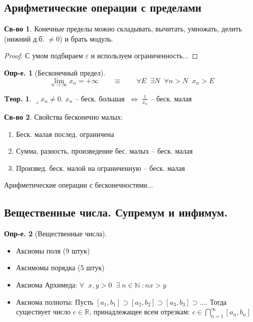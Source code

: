 \documentclass[a4paper,12pt]{article}
\numberwithin{figure}{section}
\theoremstyle{definition}
\newtheorem{definition}{Опр-е.}[section]
\newtheorem*{property}{Св-во}  %
\theoremstyle{definition}
\newtheorem{theorem}{Tеор.}[section]
\def\DS{\displaystyle}
\def\NN{\mathbb{N}}
\def\RR{\mathbb{R}}
\def\.{\;\;}
\def\eps{\varepsilon}
\def\ntoinf{n\to\infty}
\def\lets{{\huge$\lrcorner$}\space}
\def\iff{$\;\Longleftrightarrow\;$}
\begin{document}
\subsection{Арифметические операции с пределами}

\begin{property}
	Конечные пределы можно складывать, вычитать, умножать,
	делить (нижний д.б. $\ne0$) и брать модуль.
\end{property}
\begin{proof} С умом подбираем $\eps$ и используем ограниченность... \end{proof}
\bigskip

\begin{definition}[Бесконечный предел] \[
	\lim_{\ntoinf} x_n = +\infty
	\qquad\equiv\qquad
	\forall E \. \exists N \. \forall n>N \. x_n>E
\]
\end{definition}

\begin{theorem}
	\lets $x_n \neq 0$. $x_n$ -- беск. большая \iff $\DS\frac1{x_n}$ -- беск. малая
\end{theorem}

\begin{property}
	Свойства бесконечно малых:
	\begin{enumerate}
		\item Беск. малая послед. ограничена
		\item Сумма, разность, произведение бес. малых -- беск. малая
		\item Произвед. беск. малой на ограниченную -- беск. малая
	\end{enumerate}
\end{property}
\bigskip

Арифметические операции с бесконечностями...


\subsection{Вещественные числа. Супремум и инфимум.}

\begin{definition}[Вещественные числа] \ \\
	\begin{itemize}
		\item Аксиомы поля (9 штук)
		\item Аксимомы порядка (5 штук)
		\item Аксиома Архимеда:
				$ \forall\. x,y>0 \. \exists \; n \in \NN \;: nx>y $
		\item Аксиома полноты:
			Пусть $[a_1,b_1] \supset [a_2,b_2] \supset [a_3,b_3] \supset...$.
			Тогда существует число $c \in \RR$, принадлежащее всем отрезкам:
			$\DS c \in \bigcap_{n=1}^{\infty} [a_n,b_n]$
	\end{itemize}
\end{definition}
\bigskip
\end{document}
